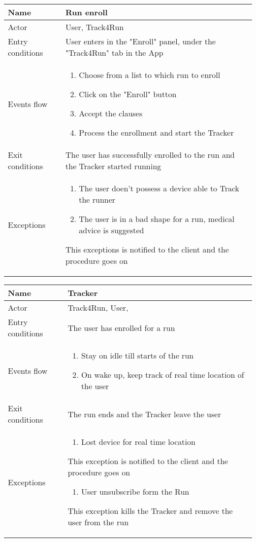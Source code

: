 \begin{table}[]
\begin{tabular}{|l|l|}
\hline
Name             & Run enroll \\ \hline
Actor            & User, Track4Run \\ \hline
Entry conditions & User enters in the "Enroll" panel, under the "Track4Run" tab in the App  \\ \hline
Events flow      & \begin{enumerate}
\item Choose from a list to which run to enroll
\item Click on the "Enroll" button
\item Accept the clauses
\item Process the enrollment and start the Tracker
\end{enumerate} \\ \hline
Exit conditions  & The user has successfully enrolled to the run and the Tracker started running \\ \hline
Exceptions       & \begin{enumerate}
\item The user doen't possess a device able to Track the runner
\item The user is in a bad shape for a run, medical advice is suggested
\end{enumerate} This exceptions is notified to the client and the procedure goes on\\ \hline
\end{tabular}
\end{table}

\begin{table}[]
\begin{tabular}{|l|l|}
\hline
Name             & Tracker \\ \hline
Actor            & Track4Run, User,  \\ \hline
Entry conditions & The user has enrolled for a run \\ \hline
Events flow      & \begin{enumerate}
\item Stay on idle till starts of the run
\item On wake up, keep track of real time location of the user
\end{enumerate} \\ \hline
Exit conditions  & The run ends and the Tracker leave the user \\ \hline
Exceptions       & \begin{enumerate}
\item Lost device for real time location
\end{enumerate} This exception is notified to the client and the procedure goes on
\begin{enumerate}
\item User unsubscribe form the Run
\end{enumerate} This exception kills the Tracker and remove the user from the run\\ \hline
\end{tabular}
\end{table}

